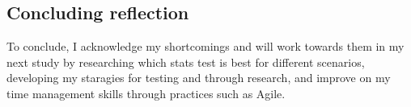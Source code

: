 \documentclass[conference]{IEEEtran}
\begin{document}
\subsection {Concluding reflection}
To conclude, I acknowledge my shortcomings and will work towards them in my next study by researching which stats test is best for different scenarios, developing my staragies for testing and through research, and improve on my time management skills through practices such as Agile.

\end{document}
